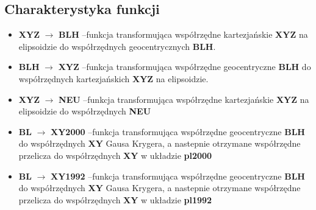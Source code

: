 \documentclass[a4paper,titleauthor]{mwart}
\begin{document}
    \subsection{Charakterystyka funkcji}
    \begin{itemize}
        \item \textbf{XYZ} $\rightarrow$ \textbf{BLH} --funkcja transformująca współrzędne kartezjańskie \textbf{XYZ} na elipsoidzie do współrzędnych geocentrycznych \textbf{BLH}.
        \begin{flushright}
            \cite{ewmapa}
        \end{flushright}
        \item \textbf{BLH} $\rightarrow$ \textbf{XYZ} --funkcja transformująca współrzędne geocentryczne \textbf{BLH} do współrzędnych kartezjańskich \textbf{XYZ} na elipsoidzie.  
        \begin{flushright}
            \cite{ewmapa}
        \end{flushright}
        \item \textbf{XYZ} $\rightarrow$ \textbf{NEU} --funkcja transformująca współrzędne kartezjańskie \textbf{XYZ} na elipsoidzie do współrzędnych \textbf{NEU}
        \begin{flushright}
            \cite{ASGEUPOS2021}
        \end{flushright}
        \item \textbf{BL} $\rightarrow$ \textbf{XY2000} --funkcja transformująca współrzędne geocentryczne \textbf{BLH} do współrzędnych \textbf{XY} Gausa Krygera, a nastepnie otrzymane współrzędne przelicza do współrzędnych \textbf{XY} w układzie \textbf{pl2000}
        \begin{flushright}
            \cite{ASGEUPOS2021}
        \end{flushright}
        \item \textbf{BL} $\rightarrow$ \textbf{XY1992} --funkcja transformująca współrzędne geocentryczne \textbf{BLH} do współrzędnych \textbf{XY} Gausa Krygera, a nastepnie otrzymane współrzędne przelicza do współrzędnych \textbf{XY} w układzie \textbf{pl1992}
        \begin{flushright}
            \cite{ASGEUPOS2021}
        \end{flushright}
    \end{itemize}
\end{document}
